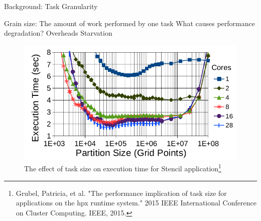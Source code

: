 \documentclass[10pt]{beamer}
\begin{document}

%		

\begin{frame}{Background: Task Granularity}
	\begin{outline}
		Grain size: The amount of work performed by one task
		\1What causes performance degradation?
		\2Overheads
		\2Starvation
		\begin{figure}
			\centering
			\includegraphics[width=0.72\linewidth]{images/task_granularity.png}
			\caption{The effect of task size on execution time for Stencil application\footnote{Grubel, Patricia, et al. "The performance implication of task size for applications on the hpx runtime system." 2015 IEEE International Conference on Cluster Computing. IEEE, 2015.}}	
	
		\end{figure}
		
	\end{outline}
\end{frame}
\end{document}
